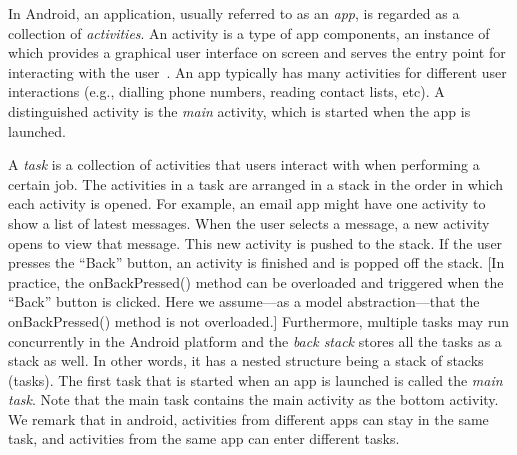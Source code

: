
In Android, an application, usually referred to as an \emph{app}, is regarded as a collection of \emph{activities}. An activity is a type of app components, an instance of which provides a graphical user interface on screen and  serves the entry point for interacting with the user~\cite{Androiddoc}. An app typically has many activities for different user interactions (e.g., dialling phone numbers, reading contact lists, etc). A distinguished activity is the \emph{main} activity, which is started when the app is launched.
%
 
 
A \emph{task} is a collection of activities that users interact with when performing a certain job.
The activities in a task are arranged in a stack %
in the order in which each activity is opened. For example, an email app might have one activity to show a list of latest messages. When the user selects a message, a new activity opens to view that message. This new activity is pushed to the stack. If the user presses the ``Back'' button, an activity is finished and is popped off the stack. [In practice, the onBackPressed() method can be overloaded and triggered when the ``Back'' button is clicked. Here we assume---as a model abstraction---that the onBackPressed() method is not overloaded.]
Furthermore, multiple tasks may run concurrently in the Android platform and the \emph{back stack} stores all the tasks as a stack as well. In other words, it has a nested structure being a stack of stacks (tasks). The first task that is started when an app is launched is called the \emph{main task}. Note that the main task contains the main activity as the bottom activity. 
%
We remark that %
in android, activities from different apps can stay in the same task, and activities from the same app can enter different tasks.

